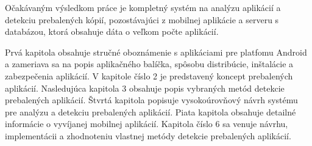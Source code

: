 Očakávaným výsledkom práce je kompletný systém na analýzu aplikácií a detekciu prebalených kópií, pozostávajúci z mobilnej aplikácie a serveru s databázou, ktorá obsahuje dáta o veľkom počte aplikácií.

Prvá kapitola obsahuje stručné oboznámenie s aplikáciami pre platfomu Android a zameriava sa na popis aplikačného balíčka, spôsobu distribúcie, inštalácie a zabezpečenia aplikácií. V kapitole číslo 2 je predstavený koncept prebalených aplikácií. Nasledujúca kapitola 3 obsahuje popis vybraných metód detekcie prebalených aplikácií. Štvrtá kapitola popisuje vysokoúrovňový návrh systému pre analýzu a detekciu prebalených aplikácií. Piata kapitola obsahuje detailné informácie o vyvíjanej mobilnej aplikácií. Kapitola číslo 6 sa venuje návrhu, implementácii a zhodnoteniu vlastnej metódy detekcie prebalených aplikácií. 
